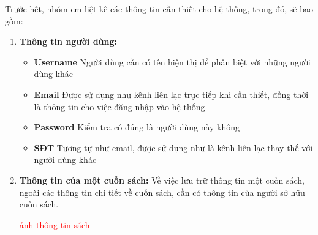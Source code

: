 \documentclass[../thesis.tex]{subfiles}
\begin{document}
	Trước hết, nhóm em liệt kê các thông tin cần thiết cho hệ thống, trong đó, sẽ bao gồm:
	\begin{enumerate}
		\item \textbf{Thông tin người dùng: }
			\begin{itemize}
				\item \textbf{Username} Người dùng cần có tên hiện thị để phân biệt với những người dùng khác\\
				\item \textbf{Email} Được sử dụng như kênh liên lạc trực tiếp khi cần thiết, đồng thời là thông tin cho việc đăng nhập vào hệ thống\\
				\item \textbf{Password} Kiểm tra có đúng là người dùng này không\\
				\item \textbf{SĐT} Tương tự như email, được sử dụng như là kênh liên lạc thay thế với người dùng khác
			\end{itemize}
		
		\item \textbf{Thông tin của một cuốn sách: }
			Về việc lưu trữ thông tin một cuốn sách, ngoài các thông tin chi tiết về cuốn sách, cần có thông tin của người sở hữu cuốn sách.		
			
			\textcolor{red}{ảnh thông tin sách}
			

\end{enumerate}
\end{document}

